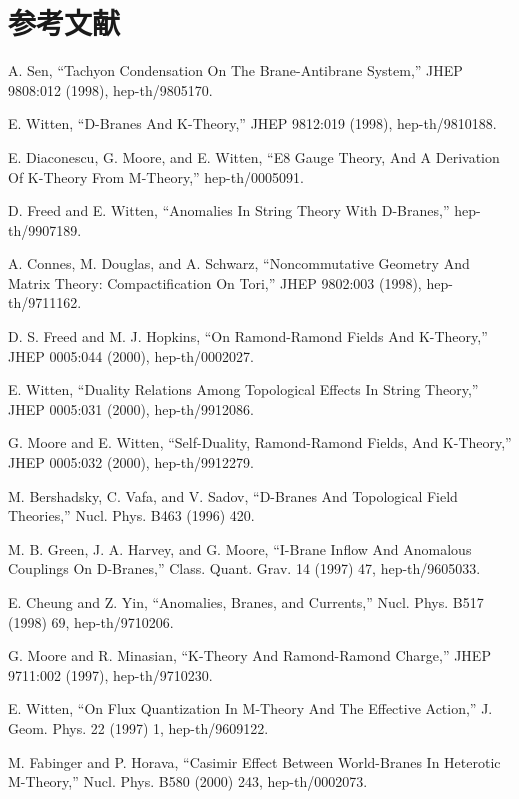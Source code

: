 \section*{参考文献}
\par\smallskip
{\small
\begin{enumerate}[label={[\arabic*]},leftmargin=2.4em,itemsep=2pt,topsep=4pt]
\item A. Sen, ``Tachyon Condensation On The Brane-Antibrane System,'' JHEP 9808:012 (1998), hep-th/9805170.
\item E. Witten, ``D-Branes And K-Theory,'' JHEP 9812:019 (1998), hep-th/9810188.
\item E. Diaconescu, G. Moore, and E. Witten, ``E8 Gauge Theory, And A Derivation Of K-Theory From M-Theory,'' hep-th/0005091.
\item D. Freed and E. Witten, ``Anomalies In String Theory With D-Branes,'' hep-th/9907189.
\item A. Connes, M. Douglas, and A. Schwarz, ``Noncommutative Geometry And Matrix Theory: Compactification On Tori,'' JHEP 9802:003 (1998), hep-th/9711162.
\item D. S. Freed and M. J. Hopkins, ``On Ramond-Ramond Fields And K-Theory,'' JHEP 0005:044 (2000), hep-th/0002027.
\item E. Witten, ``Duality Relations Among Topological Effects In String Theory,'' JHEP 0005:031 (2000), hep-th/9912086.
\item G. Moore and E. Witten, ``Self-Duality, Ramond-Ramond Fields, And K-Theory,'' JHEP 0005:032 (2000), hep-th/9912279.
\item M. Bershadsky, C. Vafa, and V. Sadov, ``D-Branes And Topological Field Theories,'' Nucl. Phys. B463 (1996) 420.
\item M. B. Green, J. A. Harvey, and G. Moore, ``I-Brane Inflow And Anomalous Couplings On D-Branes,'' Class. Quant. Grav. 14 (1997) 47, hep-th/9605033.
\item E. Cheung and Z. Yin, ``Anomalies, Branes, and Currents,'' Nucl. Phys. B517 (1998) 69, hep-th/9710206.
\item G. Moore and R. Minasian, ``K-Theory And Ramond-Ramond Charge,'' JHEP 9711:002 (1997), hep-th/9710230.
\item E. Witten, ``On Flux Quantization In M-Theory And The Effective Action,'' J. Geom. Phys. 22 (1997) 1, hep-th/9609122.
\item M. Fabinger and P. Horava, ``Casimir Effect Between World-Branes In Heterotic M-Theory,'' Nucl. Phys. B580 (2000) 243, hep-th/0002073.

\end{enumerate}}
